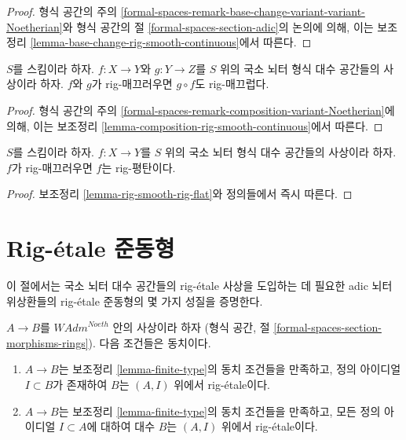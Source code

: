 \begin{proof}
형식 공간의 주의
\ref{formal-spaces-remark-base-change-variant-variant-Noetherian}와
형식 공간의 절 \ref{formal-spaces-section-adic}의 논의에 의해,
이는 보조정리 \ref{lemma-base-change-rig-smooth-continuous}에서 따른다.
\end{proof}

\begin{lemma}
\label{lemma-composition-rig-smooth}
$S$를 스킴이라 하자. $f : X \to Y$와 $g : Y \to Z$를
$S$ 위의 국소 뇌터 형식 대수 공간들의 사상이라 하자.
$f$와 $g$가 rig-매끄러우면 $g \circ f$도 rig-매끄럽다.
\end{lemma}

\begin{proof}
형식 공간의 주의
\ref{formal-spaces-remark-composition-variant-Noetherian}에 의해,
이는 보조정리 \ref{lemma-composition-rig-smooth-continuous}에서 따른다.
\end{proof}

\begin{lemma}
\label{lemma-rig-smooth-rig-flat-morphism}
$S$를 스킴이라 하자. $f : X \to Y$를 $S$ 위의 국소 뇌터
형식 대수 공간들의 사상이라 하자.
$f$가 rig-매끄러우면 $f$는 rig-평탄이다.
\end{lemma}

\begin{proof}
보조정리 \ref{lemma-rig-smooth-rig-flat}와 정의들에서 즉시 따른다.
\end{proof}

\section{Rig-\'etale 준동형}
\label{section-rig-etale-homomorphisms}

\noindent
이 절에서는 국소 뇌터 대수 공간들의 rig-\'etale 사상을 도입하는 데 필요한
adic 뇌터 위상환들의 rig-\'etale 준동형의 몇 가지 성질을 증명한다.

\begin{lemma}
\label{lemma-rig-etale-continuous}
$A \to B$를 $\textit{WAdm}^{Noeth}$ 안의 사상이라 하자
(형식 공간, 절 \ref{formal-spaces-section-morphisms-rings}).
다음 조건들은 동치이다.
\begin{enumerate}
\item[(a)] $A \to B$는 보조정리 \ref{lemma-finite-type}의 동치 조건들을
만족하고, 정의 아이디얼 $I \subset B$가 존재하여 $B$는
$(A, I)$ 위에서 rig-\'etale이다.
\item[(b)] $A \to B$는 보조정리 \ref{lemma-finite-type}의 동치 조건들을
만족하고, 모든 정의 아이디얼 $I \subset A$에 대하여 대수 $B$는
$(A, I)$ 위에서 rig-\'etale이다.
\end{enumerate}
\end{lemma}


